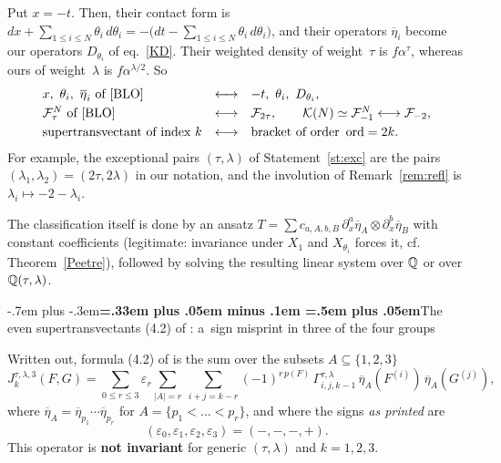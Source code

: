 \documentclass[12pt,a4paper]{amsart}
\makeatletter
\providecommand{\headspaces}{\spaceskip=.33em plus .05em minus .1em \xspaceskip=.5em plus .05em}
\def\subsection{\@startsection{subsection}{2}{0pt}{-1ex \@plus -.4ex \@minus -.2ex}%
  {-.7em plus -.3em}{\normalfont\normalsize\bfseries\boldmath\headspaces}}
\theoremstyle{thm}
\theoremstyle{definition}
\let\ssec\subsection
\newcommand {\tp}{\otimes}
\newcommand {\Nord}{\operatorname{ord}}   %
\newcommand {\etb}{\overline{\eta}}
\newcommand {\Jop}{J}
\makeatother
\begin{document}
\label{s:dict}
Put $x=-t$. Then, their contact form is $dx+\sum_{1\leq i\leq N}\theta_i\,d\theta_i=-\big(dt-\sum_{1\leq i\leq N}\theta_i\,d\theta_i\big)$, and their operators $\etb_i$ become our operators $D_{\theta_i}$ of eq.~\eqref{KD}. Their weighted density of weight~$\tau$ is $f\alpha^\tau$, whereas ours of weight~$\lambda$ is $f\alpha^{\lambda/2}$. So
\begin{equation}\label{bloDict}
\begin{array}{lcl}
x,\ \theta_i,\ \etb_i\ \text{of \cite{BLO}}&\longleftrightarrow&-t,\ \theta_i,\ D_{\theta_i},\\[1mm]
\cF^N_\tau\ \text{of \cite{BLO}}&\longleftrightarrow&\cF_{2\tau},\qquad \cK(N)\simeq\cF^N_{-1}\longleftrightarrow\cF_{-2},\\[1mm]
\text{supertransvectant of index }k&\longleftrightarrow&\text{bracket of order }\Nord=2k.
\end{array}
\end{equation}
For example, the exceptional pairs $(\tau,\lambda)$ of Statement~\ref{st:exc} are the pairs $(\lambda_1,\lambda_2)=(2\tau,2\lambda)$ in our notation, and the involution of Remark~\ref{rem:refl} is $\lambda_i\longmapsto-2-\lambda_i$.



The classification itself is done by an ansatz
$T=\sum c_{a,A,b,B}\,\partial_x^{a}\etb_A\tp\partial_x^{b}\etb_B$ with constant coefficients
(legitimate: invariance under $X_1$ and $X_{\theta_i}$ forces it, cf. Theorem~\ref{Peetre}),
followed by solving the resulting linear system over ${\mathbb Q}$ or over ${\mathbb Q}(\tau,\lambda)$.

\ssec{The even supertransvectants (4.2) of \cite{BLO}: a~sign misprint in three of the four
groups}\label{s:42}

\label{s:42a}
Written out, formula (4.2) of \cite{BLO} is the sum over the subsets $A\subseteq\{1,2,3\}$
\begin{equation}\label{eq:42}
\Jop^{\tau,\lambda,3}_k(F,G)=\sum_{0\leq r\leq 3}\varepsilon_r\sum_{|A|=r}\
\sum_{i+j=k-r}(-1)^{r\,p(F)}\,\Gamma^{\tau,\lambda}_{i,j,k-1}\,
\etb_A(F^{(i)})\,\etb_A(G^{(j)}),
\end{equation}
where $\etb_A=\etb_{p_1}\cdots\etb_{p_r}$ for $A=\{p_1<\dots<p_r\}$, and where the signs
\textit{as printed} are
\[
(\varepsilon_0,\varepsilon_1,\varepsilon_2,\varepsilon_3)=(-,-,-,+).
\]
This operator is \textbf{not invariant} for generic $(\tau,\lambda)$ and $k=1,2,3$. 
\end{document}
